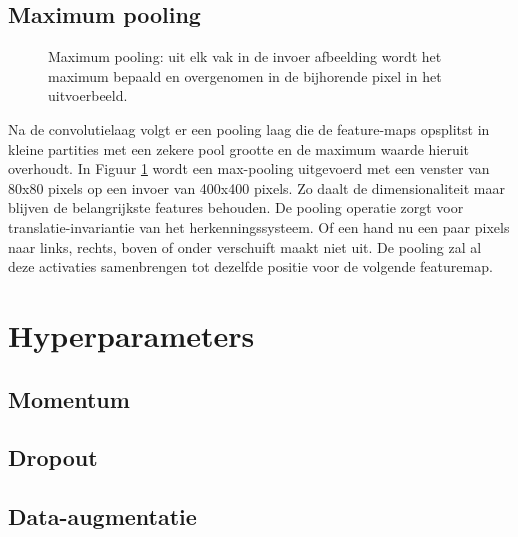 \subsection{Maximum pooling}

\begin{figure}
	\centering
	
	\caption{Maximum pooling: uit elk vak in de invoer afbeelding wordt het maximum bepaald en overgenomen in de bijhorende pixel in het uitvoerbeeld.}
	\label{fig:max-pooling}
\end{figure}
Na de convolutielaag volgt er een pooling laag die de feature-maps opsplitst in kleine partities met een zekere pool grootte en de maximum waarde hieruit overhoudt. In Figuur \ref{fig:max-pooling} wordt een max-pooling uitgevoerd met een venster van 80x80 pixels op een invoer van 400x400 pixels. Zo daalt de dimensionaliteit maar blijven de belangrijkste features behouden.
\npar De pooling operatie zorgt voor translatie-invariantie van het herkenningssysteem. Of een hand nu een paar pixels naar links, rechts, boven of onder verschuift maakt niet uit. De pooling zal al deze activaties samenbrengen tot dezelfde positie voor de volgende featuremap. 


\section{Hyperparameters}
\subsection{Momentum}
\subsection{Dropout}\label{sec:dropout}


\cite{dropout}
\subsection{Data-augmentatie}\label{sec:data-augm}